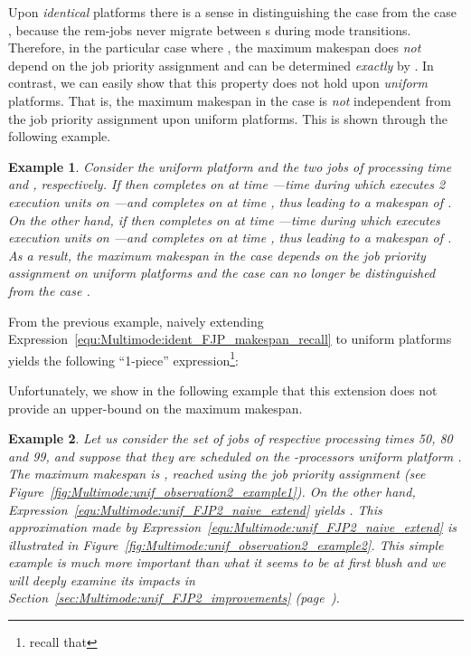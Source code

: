 \documentclass{article}
\newtheorem{validity test}{Validity Test}
\newtheorem{Example}{Example}
\begin{document}
Upon \emph{identical} platforms there is a sense in distinguishing the case  from the case , because the rem-jobs never migrate between s during mode transitions. Therefore, in the particular case where , the maximum makespan does \emph{not} depend on the job priority assignment and can be determined \emph{exactly} by . In contrast, we can easily show that this property does not hold upon \emph{uniform} platforms. That is, the maximum makespan in the case  is \emph{not} independent from the job priority assignment upon uniform platforms. This is shown through the following example.

\begin{Example}
Consider the uniform platform  and the two jobs  of processing time  and , respectively. If  then  completes on  at time ---time during which  executes 2 execution units on ---and  completes on  at time , thus leading to a makespan of . On the other hand, if  then  completes on  at time ---time during which  executes  execution units on ---and  completes on  at time , thus leading to a makespan of . As a result, the maximum makespan in the case  \emph{depends} on the job priority assignment on uniform platforms and the case  can no longer be distinguished from the case . 
\end{Example}

From the previous example, naively extending Expression~\ref{equ:Multimode:ident_FJP_makespan_recall} to uniform platforms yields the following ``1-piece'' expression\footnote{recall that }:


Unfortunately, we show in the following example that this extension does not provide an upper-bound on the maximum makespan.

\begin{Example}
\label{ex:under_approximation}
Let us consider the set  of  jobs  of respective processing times 50, 80 and 99, and suppose that they are scheduled on the -processors uniform platform . The maximum makespan is , reached using the job priority assignment  (see Figure~\ref{fig:Multimode:unif_observation2_example1}). On the other hand, Expression~\ref{equ:Multimode:unif_FJP2_naive_extend} yields . This approximation made by Expression~\ref{equ:Multimode:unif_FJP2_naive_extend} is illustrated in Figure~\ref{fig:Multimode:unif_observation2_example2}. This simple example is \emph{much} more important than what it seems to be at first blush and we will deeply examine its impacts in Section~\ref{sec:Multimode:unif_FJP2_improvements} (page~\pageref{sec:Multimode:unif_FJP2_improvements}). 
\end{Example}
\end{document}
